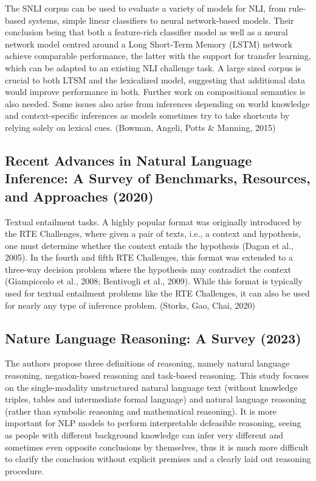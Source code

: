 \documentclass[fleqn,moreauthors,10pt]{ds_report}
\begin{document}
The SNLI corpus can be used to evaluate a variety of models for NLI, from rule-based systems, simple linear classifiers to neural network-based models. Their conclusion being that both a feature-rich classifier model as well as a neural network model centred around a Long Short-Term Memory (LSTM) network achieve comparable performance, the latter with the support for transfer learning, which can be adapted to an existing NLI challenge task. A large sized corpus is crucial to both LTSM and the lexicalized model, suggesting that additional data would improve performance in both. Further work on compositional semantics is also needed. Some issues also arise from inferences depending on world knowledge and context-specific inferences as models sometimes try to take shortcuts by relying solely on lexical cues. (Bowman, Angeli, Potts \& Manning, 2015)

\subsection*{Recent Advances in Natural Language Inference: A Survey of Benchmarks, Resources, and Approaches (2020)}

Textual entailment tasks. A highly popular format was originally introduced by the RTE Challenges, where given a pair of texts, i.e., a context and hypothesis, one must determine whether the context entails the hypothesis (Dagan et al., 2005). In the fourth and fifth RTE Challenges, this format was extended to a three-way decision problem where the hypothesis may contradict the context (Giampiccolo et al., 2008; Bentivogli et al., 2009). While this format is typically used for textual entailment problems like the RTE Challenges, it can also be used for nearly any type of inference problem. (Storks, Gao, Chai, 2020)

\subsection*{Nature Language Reasoning: A Survey (2023)}

The authors propose three definitions of reasoning, namely natural language reasoning, negation-based reasoning and task-based reasoning. This study focuses on the single-modality unstructured natural language text (without knowledge triples, tables and intermediate formal language) and natural language reasoning (rather than symbolic reasoning and mathematical reasoning). It is more important for NLP models to perform interpretable defeasible reasoning, seeing as people with different background knowledge can infer very different and sometimes even opposite conclusions by themselves, thus it is much more difficult to clarify the conclusion without explicit premises and a clearly laid out reasoning procedure.
\end{document}
